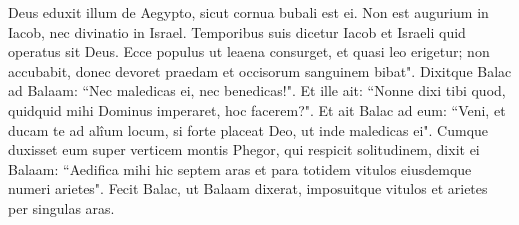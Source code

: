 \begin{biblechapter}
\verse Deus eduxit illum de Aegypto, sicut cornua bubali est ei. 
\verse Non est augurium in Iacob, nec divinatio in Israel. Temporibus suis dicetur Iacob et Israeli quid operatus sit Deus. 
\verse Ecce populus ut leaena consurget, et quasi leo erigetur; non accubabit, donec devoret praedam et occisorum sanguinem bibat". 
\verse Dixitque Balac ad Balaam: “Nec maledicas ei, nec benedicas!". 
\verse Et ille ait: “Nonne dixi tibi quod, quidquid mihi Dominus imperaret, hoc facerem?". 
\verse Et ait Balac ad eum: “Veni, et ducam te ad alîum locum, si forte placeat Deo, ut inde maledicas ei". 
\verse Cumque duxisset eum super verticem montis Phegor, qui respicit solitudinem, 
\verse dixit ei Balaam: “Aedifica mihi hic septem aras et para totidem vitulos eiusdemque numeri arietes". 
\verse Fecit Balac, ut Balaam dixerat, imposuitque vitulos et arietes per singulas aras. 
\end{biblechapter}

